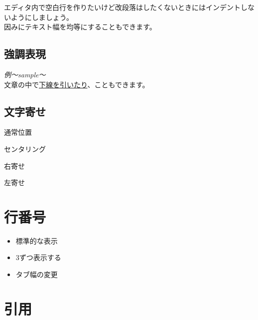 \documentclass{jsarticle}					%
\begin{document}
	\noindent エディタ内で空白行を作りたいけど改段落はしたくないときにはインデントしないようにしましょう。\\
	因みにテキスト幅を均等にすることもできます。\linebreak
	
\subsection{強調表現}
	\emph{例〜sample〜}\\
	文章の中で\underline{下線を引いたり}、こともできます。
	
\subsection{文字寄せ}
	\noindent 通常位置
	\begin{center}
		センタリング
	\end{center}
	\begin{flushright}
		右寄せ
	\end{flushright}
	\begin{flushleft}
		左寄せ
	\end{flushleft}

\section{行番号}
	\begin{itemize}
		\item 標準的な表示
		\item 3ずつ表示する
		\item タブ幅の変更
	\end{itemize}
	
\section{引用}
\end{document}
